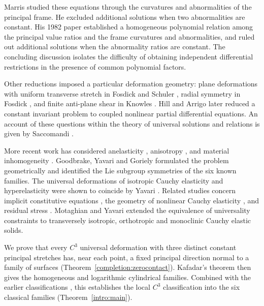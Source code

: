 \documentclass[11pt,a4paper]{article}
\numberwithin{equation}{section}
\theoremstyle{plain}
\theoremstyle{definition}
\theoremstyle{remark}
\begin{document}
Marris \cite{Marris1975} studied these equations through the curvatures
and abnormalities of the principal frame. He excluded additional
solutions when two abnormalities are constant. His 1982 paper
\cite[Main Theorems~1 and~2]{Marris1982} established a homogeneous
polynomial relation among the principal value ratios and the frame
curvatures and abnormalities, and ruled out additional solutions when
the abnormality ratios are constant. The concluding discussion
\cite[pp.~171--172]{Marris1982} isolates the difficulty of obtaining
independent differential restrictions in the presence of common
polynomial factors.

Other reductions imposed a particular deformation geometry: plane
deformations with uniform transverse stretch in Fosdick and Schuler
\cite{FosdickSchuler1969}, radial symmetry in Fosdick
\cite{Fosdick1971}, and finite anti-plane shear in Knowles
\cite{Knowles1979}. Hill and Arrigo \cite{HillArrigo1999} later reduced
a constant invariant problem to coupled nonlinear partial differential
equations. An account of these questions within the theory of universal
solutions and relations is given by Saccomandi \cite{Saccomandi2001}.

More recent work has considered anelasticity
\cite{YavariGoriely2016,Goodbrake2020}, anisotropy
\cite{YavariGoriely2021}, and material inhomogeneity
\cite{Yavari2021,YavariGoriely2023}.
Goodbrake, Yavari and Goriely \cite{Goodbrake2020} formulated the
problem geometrically and identified the Lie subgroup symmetries of the
six known families. The universal deformations of isotropic Cauchy
elasticity and hyperelasticity were shown to coincide by Yavari
\cite{Yavari2024}. Related studies concern implicit constitutive
equations \cite{YavariGoriely2024Implicit}, the geometry of nonlinear
Cauchy elasticity \cite{YavariGoriely2025}, and residual stress
\cite{YavariMerodioShariff2025,Yavari2026Residual}.
Motaghian and Yavari \cite{MotaghianYavari2026} extended the equivalence
of universality constraints to transversely isotropic, orthotropic and
monoclinic Cauchy elastic solids.

We prove that every $C^3$ universal deformation with three distinct
constant principal stretches has, near each point, a fixed principal
direction normal to a family of surfaces
(Theorem~\ref{completion:zerocontact}). Kafadar's theorem
\cite{Kafadar1972} then gives the homogeneous
and logarithmic cylindrical families. Combined with the earlier
classifications
\cite{Ericksen1954,MarrisShiau1970,MarrisShiauCorr1970,MartinCarlson1976},
this establishes the local $C^3$ classification into the six classical
families (Theorem~\ref{intro:main}).
\end{document}
